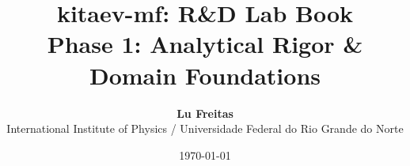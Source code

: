 \documentclass[11pt,a4paper,oneside]{memoir}
\title{\Huge\bfseries\color{labbookaccent} kitaev-mf: R\&D Lab Book\\[4mm]
\Large Phase 1: Analytical Rigor \& Domain Foundations}
\author{\textbf{Lu Freitas}\\[1mm]
International Institute of Physics / Universidade Federal do Rio Grande do Norte}
\date{\today}
\begin{document}
\frontmatter
\maketitle
\tableofcontents*

\mainmatter







\end{document}
